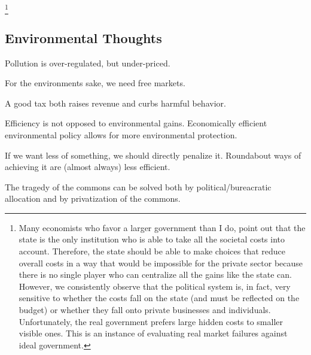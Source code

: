 \footnote{Many economists who favor a larger government than I do, point out
that the state is the only institution who is able to take all the societal
costs into account. Therefore, the state should be able to make choices that
reduce overall costs in a way that would be impossible for the private sector
because there is no single player who can centralize all the gains like the
state can. However, we consistently observe that the political system is, in
fact, very sensitive to whether the costs fall on the state (and must be
reflected on the budget) or whether they fall onto private businesses and
individuals. Unfortunately, the real government prefers large hidden costs to
smaller visible ones. This is an instance of evaluating real market failures
against ideal government.}

\subsection{Environmental Thoughts}

\thought Pollution is over-regulated, but under-priced.

\thought For the environments sake, we need free markets.

\thought A good tax both raises revenue and curbs harmful behavior.

\thought Efficiency is not opposed to environmental gains. Economically
efficient environmental policy allows for more environmental protection.

\thought If we want less of something, we should directly penalize it.
Roundabout ways of achieving it are (almost always) less efficient.

\thought The tragedy of the commons can be solved both by political/bureacratic
allocation and by privatization of the commons.

